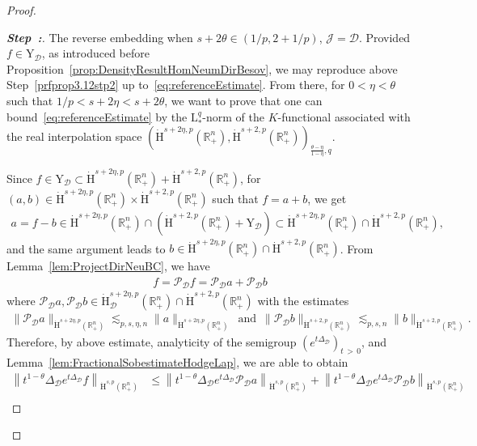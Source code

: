 \documentclass[AHL,Unicode,longabstracts,published]{cedram}
\newcommand{\bbR}{\mathbb{R}}
\newcommand{\rmH}{\mathrm{H}}%
\newcommand{\rmL}{\mathrm{L}}
\newcommand{\rmY}{\mathrm{Y}}
\newcommand{\clJ}{\mathcal{J}}
\newcommand{\clD}{\mathcal{D}}
\newcommand{\clP}{\mathcal{P}}
\newcounter{stepcount}
\newenvironment{step}{\refstepcounter{stepcount}\begin{proof}[\textbf{Step~\thestepcount:}]}{\let\qed\relax\end{proof}}
\begin{document}
\begin{proof}
\begin{step}\label{prfprop3.12stp3}
The reverse embedding when $s+2\theta\in(1/p,2+1/p)$, $\clJ=\clD$. Provided $f\in \rmY_\clD$, as introduced before Proposition~\ref{prop:DensityResultHomNeumDirBesov}, we may reproduce above Step~\ref{prfprop3.12stp2} up to~\eqref{eq:referenceEstimate}. From there, for $0<\eta<\theta$ such that $1/p<s+2\eta<s+2\theta$, we want to prove that one can bound~\eqref{eq:referenceEstimate} by the $\rmL^q_\ast$-norm of the $K$-functional associated with the real interpolation space $(\dot{\rmH}^{s+2\eta,p}(\bbR^n_+),\dot{\rmH}^{s+2,p}(\bbR^n_+))_{\frac{\theta-\eta}{1-\eta},q}$.

Since $f\in\rmY_\clD\subset\dot{\rmH}^{s+2\eta,p}(\bbR^n_+)+\dot{\rmH}^{s+2,p}(\bbR^n_+)$, for $(a,b)\in\dot{\rmH}^{s+2\eta,p}(\bbR^n_+)\times\dot{\rmH}^{s+2,p}(\bbR^n_+)$ such that $f=a+b$, we get
\begin{align*}
a=f-b \in \dot{\rmH}^{s+2\eta,p}\left(\bbR^n_+\right)\cap(\dot{\rmH}^{s+2,p}\left(\bbR^n_+\right)+\rmY_\clD) \subset \dot{\rmH}^{s+2\eta,p}\left(\bbR^n_+\right)\cap\dot{\rmH}^{s+2,p}\left(\bbR^n_+\right),
\end{align*}
and the same argument leads to $b \in \dot{\rmH}^{s+2\eta,p}(\bbR^n_+)\cap\dot{\rmH}^{s+2,p}(\bbR^n_+)$. From Lemma~\ref{lem:ProjectDirNeuBC}, we have
\begin{align*}
f = \clP _\clD f = \clP _\clD a + \clP _\clD b
\end{align*}
where $\clP _\clD a,\clP _\clD b\in \dot{\rmH}^{s+2\eta,p}_\clD(\bbR^n_+)\cap\dot{\rmH}^{s+2,p}(\bbR^n_+)$ with the estimates
\begin{align*}
\| \clP _\clD a\|_{\dot{\rmH}^{s+2\eta,p}\left(\bbR^n_+\right)}\lesssim_{p,s,\eta,n} \| a \|_{\dot{\rmH}^{s+2\eta,p}\left(\bbR^n_+\right)}\,\text{ and }\,\| \clP _\clD b\|_{\dot{\rmH}^{s+2,p}\left(\bbR^n_+\right)}\lesssim_{p,s,n} \| b \|_{\dot{\rmH}^{s+2,p}\left(\bbR^n_+\right)}.
\end{align*}
Therefore, by above estimate, analyticity of the semigroup $(e^{t\Delta_{\clD}})_{t\,>\,0}$, and Lemma~\ref{lem:FractionalSobestimateHodgeLap}, we are able to obtain
\begin{align*}
\left\| t^{1-\theta} \Delta_{\clD}e^{t\Delta_{\clD}} f\right\|_{\dot{\rmH}^{s,p}\left(\bbR^n_+\right)} &\leqslant \left\| t^{1-\theta} \Delta_{\clD}e^{t\Delta_{\clD}} \clP _\clD {a}\right\|_{\dot{\rmH}^{s,p}\left(\bbR^n_+\right)} + \left\| t^{1-\theta} \Delta_{\clD}e^{t\Delta_{\clD}} \clP _\clD {b}\right\|_{\dot{\rmH}^{s,p}\left(\bbR^n_+\right)}\\

\end{align*}
\end{step}
\end{proof}
\end{document}
